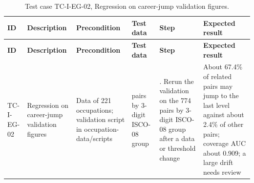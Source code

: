 {\footnotesize{}\renewcommand{\arraystretch}{1.1}
\begin{longtable}{|>{\raggedright\arraybackslash}p{}|>{\raggedright\arraybackslash}p{}|>{\raggedright\arraybackslash}p{}|>{\raggedright\arraybackslash}p{}|>{\raggedright\arraybackslash}p{}|>{\raggedright\arraybackslash}p{}|}
\caption{Test case TC-I-EG-02, Regression on career-jump validation figures.} \\
\hline
\textbf{ID} & \textbf{Description} & \textbf{Precondition} & \textbf{Test data} & \textbf{Step} & \textbf{Expected result} \\ \hline
\endfirsthead
\hline
\textbf{ID} & \textbf{Description} & \textbf{Precondition} & \textbf{Test data} & \textbf{Step} & \textbf{Expected result} \\ \hline
\endhead
TC-I-EG-02 & Regression on career-jump validation figures & Data of 221 occupations; validation script in occupation-\allowbreak{}data/\allowbreak{}scripts & 774 pairs by 3-digit ISCO-08 group & 1. Rerun the validation on the 774 pairs by 3-digit ISCO-08 group after a data or threshold change & About 67.4\% of related pairs may jump to the last level against about 2.4\% of other pairs; coverage AUC about 0.909; a large drift needs review \\ \hline
\end{longtable}
}

